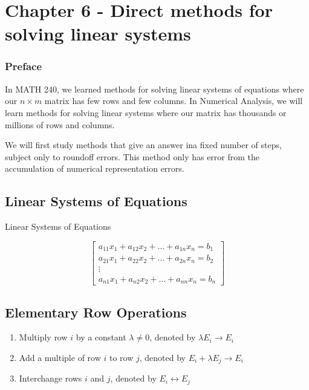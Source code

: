 \section{Chapter 6 - Direct methods for solving linear systems}

\subsubsection*{Preface}

In MATH 240, we learned methods for solving linear systems of equations where
our $n \times m$ matrix has few rows and few columns. In Numerical Analysis, we
will learn methods for solving linear systems where our matrix has thousands or
millions of rows and columns.

We will first study methods that give an answer ina  fixed number of steps, 
subject only to roundoff errors. This method only has error from the accumulation
of numerical representation errors.

\subsection{Linear Systems of Equations}

Linear Systems of Equations

\begin{equation*}
  \begin{bmatrix}
    a_{11} x_1 + a_{12} x_2 + \dots + a_{1n} x_n = b_1 \\
    a_{21} x_1 + a_{22} x_2 + \dots + a_{2n} x_n = b_2 \\
    \vdots \\
    a_{n1} x_1 + a_{n2} x_2 + \dots + a_{nn} x_n = b_n
  \end{bmatrix}
\end{equation*}

\subsection{Elementary Row Operations}

\begin{enumerate}
\item Multiply row $i$ by a constant $\lambda \ne 0$, denoted by 
  $\lambda E_i \to E_i$
\item Add a multiple of row $i$ to row $j$, denoted by $E_i + \lambda E_j \to E_i$
\item Interchange rows $i$ and $j$, denoted by $E_i \leftrightarrow E_j$
\end{enumerate}

